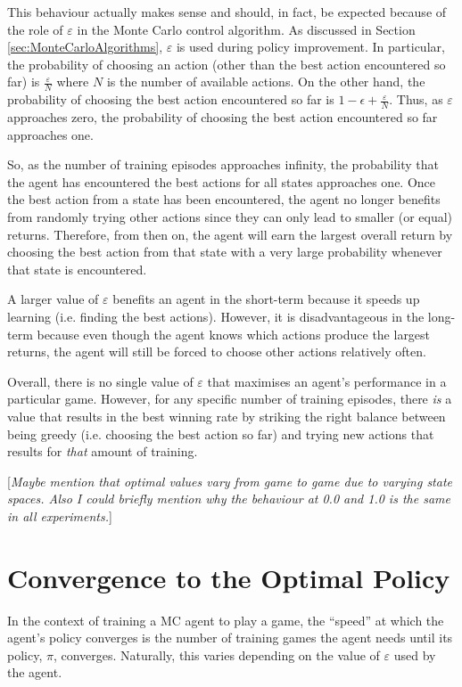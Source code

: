 \documentclass[11pt,a4paper]{report}
\begin{document}
This behaviour actually makes sense and should, in fact, be expected because of the role of $\varepsilon$ in the Monte Carlo control algorithm. As discussed in Section \ref{sec:MonteCarloAlgorithms}, $\varepsilon$ is used during policy improvement. In particular, the probability of choosing an action (other than the best action encountered so far) is $\frac{\varepsilon}{N}$ where $N$ is the number of available actions. On the other hand, the probability of choosing the best action encountered so far is  $1 - \epsilon + \frac{\varepsilon}{N}$. Thus, as $\varepsilon$ approaches zero, the probability of choosing the best action encountered so far approaches one.

So, as the number of training episodes approaches infinity, the probability that the agent has encountered the best actions for all states approaches one. Once the best action from a state has been encountered, the agent no longer benefits from randomly trying other actions since they can only lead to smaller (or equal) returns. Therefore, from then on, the agent will earn the largest overall return by choosing the best action from that state with a very large probability whenever that state is encountered.

A larger value of $\varepsilon$ benefits an agent in the short-term because it speeds up learning (i.e. finding the best actions). However, it is disadvantageous in the long-term because even though the agent knows which actions produce the largest returns, the agent will still be forced to choose other actions relatively often.

Overall, there is no single value of $\varepsilon$ that maximises an agent's performance in a particular game. However, for any specific number of training episodes, there \emph{is} a value that results in the best winning rate by striking the right balance between being greedy (i.e. choosing the best action so far) and trying new actions that results for \emph{that} amount of training.

[\emph{Maybe mention that optimal values vary from game to game due to varying state spaces. Also I could briefly mention why the behaviour at 0.0 and 1.0 is the same in all experiments.}]


\section{Convergence to the Optimal Policy}

In the context of training a MC agent to play a game, the ``speed'' at which the agent's policy converges is the number of training games the agent needs until its policy, $\pi$, converges. Naturally, this varies depending on the value of $\varepsilon$ used by the agent.
\end{document}
